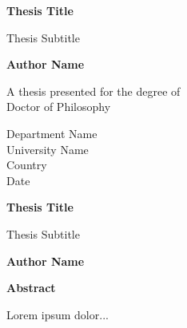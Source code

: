 \documentclass[french]{article}
\begin{document}
\graphicspath{{images/}{~/}{~/f/CARTOGRAPHIE/Plans/2_Topo_EnCours/hotel_de_ville/20131210/Station\ 1/Points\ cible\ S1/}}




\begin{titlepage}
  \begin{center}
    \vspace*{1cm}

    \Huge
    \textbf{Thesis Title}

    \vspace{0.5cm}
    \LARGE
    Thesis Subtitle

    \vspace{1.5cm}

    \textbf{Author Name}

    \vfill

    A thesis presented for the degree of\\
    Doctor of Philosophy

    \vspace{0.8cm}


    \Large
    Department Name\\
    University Name\\
    Country\\
    Date

  \end{center}
\end{titlepage}

\thispagestyle{plain}
\begin{center}
  \Large
  \textbf{Thesis Title}

  \vspace{0.4cm}
  \large
  Thesis Subtitle

  \vspace{0.4cm}
  \textbf{Author Name}

  \vspace{0.9cm}
  \textbf{Abstract}
\end{center}
Lorem ipsum dolor...
\end{document}
